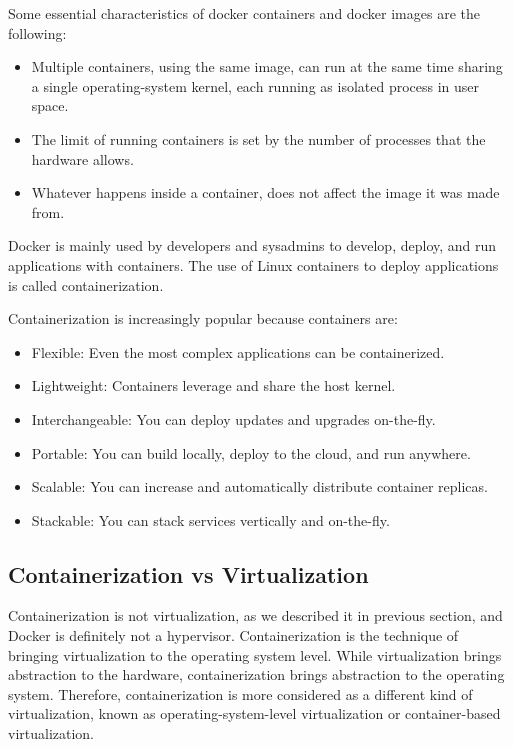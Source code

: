 Some essential characteristics of docker containers and docker images are the following:
\begin{itemize}
\item Multiple containers, using the same image, can run at the same time sharing a single operating-system kernel, each running as isolated process in user space.
\item The limit of running containers is set by the number of processes that the hardware allows.
\item Whatever happens inside a container, does not affect the image it was made from.
\end{itemize}

Docker is mainly used by developers and sysadmins to develop, deploy, and run applications with containers. The use of Linux containers to deploy applications is called containerization.

Containerization is increasingly popular because containers are: \cite{dockergetstarted}
\begin{itemize}
\item Flexible: Even the most complex applications can be containerized.
\item Lightweight: Containers leverage and share the host kernel.
\item Interchangeable: You can deploy updates and upgrades on-the-fly.
\item Portable: You can build locally, deploy to the cloud, and run anywhere.
\item Scalable: You can increase and automatically distribute container replicas.
\item Stackable: You can stack services vertically and on-the-fly.
\end{itemize}

\subsection{Containerization vs Virtualization}

Containerization is not virtualization, as we described it in previous section, and Docker is definitely not a hypervisor. Containerization is the technique of bringing virtualization to the operating system level. While virtualization brings abstraction to the hardware, containerization brings abstraction to the operating system. \cite{conteintro} Therefore, containerization is more considered as a different kind of virtualization, known as operating-system-level virtualization or container-based virtualization.

